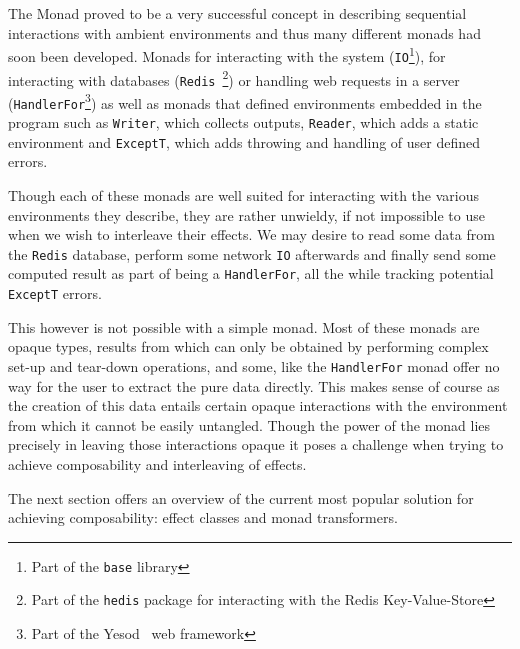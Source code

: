 The Monad proved to be a very successful concept in describing
sequential interactions with ambient environments and thus many
different monads had soon been developed. Monads for interacting with
the system (\texttt{IO}\footnote{Part of the \texttt{base} library}),
for interacting with databases (\texttt{Redis}~\footnote{Part of the
  \texttt{hedis}\cite{hedis} package for interacting with the Redis
  Key-Value-Store}) or handling web requests in a server
(\texttt{HandlerFor}\footnote{Part of the Yesod~\cite{yesod} web
  framework}) as well as monads that defined environments embedded in
the program such as \texttt{Writer}, which collects outputs,
\texttt{Reader}, which adds a static environment and \texttt{ExceptT},
which adds throwing and handling of user defined errors.

Though each of these monads are well suited for interacting with the
various environments they describe, they are rather unwieldy, if not
impossible to use when we wish to interleave their effects. We may
desire to read some data from the \texttt{Redis} database, perform
some network \texttt{IO} afterwards and finally send some computed
result as part of being a \texttt{HandlerFor}, all the while tracking
potential \texttt{ExceptT} errors.

This however is not possible with a simple monad. Most of these monads
are opaque types, results from which can only be obtained by
performing complex set-up and tear-down operations, and some, like the
\texttt{HandlerFor} monad offer no way for the user to extract the
pure data directly. This makes sense of course as the creation of this
data entails certain opaque interactions with the environment from
which it cannot be easily untangled. Though the power of the monad
lies precisely in leaving those interactions opaque it poses a
challenge when trying to achieve composability and interleaving of
effects.

The next section offers an overview of the current most popular
solution for achieving composability: effect classes and monad
transformers.

